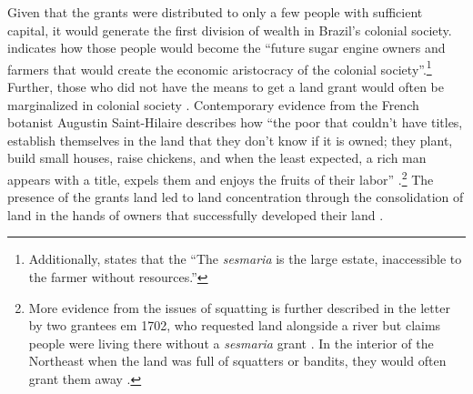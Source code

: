 \documentclass[11pt]{article}
\newcommand{\red}[1]{\textcolor{red}{#1}}
\begin{document}
Given that the grants were distributed to only a few people with sufficient capital, it would generate the first division of wealth in Brazil's colonial society.
\textcite[p.~36]{Lima1954-td} indicates how those people would become the ``future sugar engine owners and farmers that would create the economic aristocracy of the colonial society''.\footnote{Additionally, \textcite[p.~47]{Lima1954-td} states that the ``The \textit{sesmaria} is the large estate, inaccessible to the farmer without resources.''} 
Further, those who did not have the means to get a land grant would often be marginalized in colonial society \parencite{Simonsen2005-ps}.
Contemporary evidence from the French botanist Augustin Saint-Hilaire describes how ``the poor that couldn't have titles, establish themselves in the land that they don't know if it is owned; they plant, build small houses, raise chickens, and when the least expected, a rich man appears with a title, expels them and enjoys the fruits of their labor'' \parencite[p.~143]{Da_Costa_Porto1979-dz}.\footnote{More evidence from the issues of squatting is further described in the letter by two grantees em 1702, who requested land alongside a river but claims people were living there without a \textit{sesmaria} grant \parencite[p.~142]{Da_Costa_Porto1979-dz}. In the interior of the Northeast when the land was full of squatters or bandits, they would often grant them away \parencite[p.~88]{Poppino1968-ab}.}
The presence of the grants land led to land concentration through the consolidation of land in the hands of owners that successfully developed their land \parencite{Manchester1931-zw}.

\begin{comment}
\red{Need more in-depth discussion of the history here}

\red{Political Effects}: \parencite{Leal2012-gj}.

\red{History of land inequality being bad in 1920 \parencite[p.~124]{Bertola2017-hr}}
\end{comment}


\end{document}
